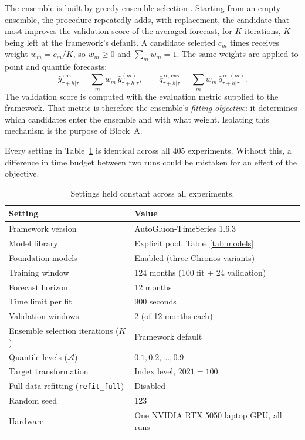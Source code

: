 \documentclass[12pt]{article}
\begin{document}
The ensemble is built by greedy ensemble selection \citep{caruana2004}.
Starting from an empty ensemble, the procedure repeatedly adds, with
replacement, the candidate that most improves the validation score of the
averaged forecast, for $K$ iterations, $K$ being left at the framework's
default. A
candidate selected $c_m$ times receives weight $w_m = c_m / K$, so $w_m \ge 0$
and $\sum_m w_m = 1$. The same weights are applied to point and quantile
forecasts:
\begin{equation}
    \hat{y}^{\,\text{ens}}_{\tau+h|\tau} = \sum_{m} w_m \, \hat{y}^{(m)}_{\tau+h|\tau},
    \qquad
    \hat{q}^{\,\alpha,\,\text{ens}}_{\tau+h|\tau} = \sum_{m} w_m \, \hat{q}^{\,\alpha,(m)}_{\tau+h|\tau}.
    \label{eq:ensemble}
\end{equation}
The validation score is computed with the evaluation metric supplied to the
framework. That metric is therefore the ensemble's \emph{fitting objective}: it
determines which candidates enter the ensemble and with what weight. Isolating
this mechanism is the purpose of Block~A.

Every setting in Table~\ref{tab:controls} is identical across all 405
experiments. Without this, a difference in time budget between two runs could
be mistaken for an effect of the objective.

\begin{table}[htbp]
\centering
\caption{Settings held constant across all experiments.}
\label{tab:controls}
\begin{tabular}{ll}
\toprule
Setting & Value \\
\midrule
Framework version                   & AutoGluon-TimeSeries 1.6.3 \\
Model library                       & Explicit pool, Table~\ref{tab:models} \\
Foundation models                   & Enabled (three Chronos variants) \\
Training window                     & 124 months (100 fit + 24 validation) \\
Forecast horizon                    & 12 months \\
Time limit per fit                  & 900 seconds \\
Validation windows                  & 2 (of 12 months each) \\
Ensemble selection iterations ($K$) & Framework default \\
Quantile levels ($\mathcal{A}$)     & $0.1, 0.2, \dots, 0.9$ \\
Target transformation               & Index level, $2021 = 100$ \\
Full-data refitting (\texttt{refit\_full}) & Disabled \\
Random seed                         & 123 \\
Hardware                            & One NVIDIA RTX 5050 laptop GPU, all runs \\
\bottomrule
\end{tabular}
\end{table}
\end{document}
